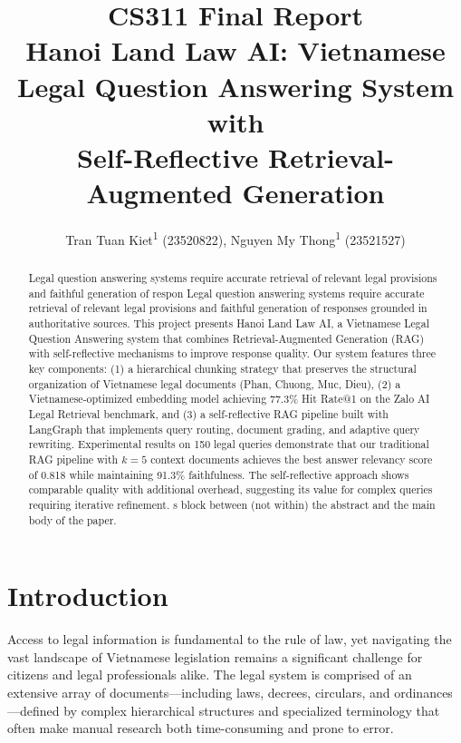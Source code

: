 \documentclass[letterpaper]{article} %
\title{CS311 Final Report \\ 
Hanoi Land Law AI: Vietnamese Legal Question Answering System with \\ Self-Reflective Retrieval-Augmented Generation}
\author{
    Tran Tuan Kiet\textsuperscript{\rm 1} (23520822),
    Nguyen My Thong\textsuperscript{\rm 1}  (23521527)
}
\begin{document}
\maketitle

\begin{abstract}
Legal question answering systems require accurate retrieval of relevant legal provisions and faithful generation of respon	Legal question answering systems require accurate retrieval of relevant legal provisions and faithful generation of responses grounded in authoritative sources. This project presents Hanoi Land Law AI, a Vietnamese Legal Question Answering system that combines Retrieval-Augmented Generation (RAG) with self-reflective mechanisms to improve response quality. Our system features three key components: (1) a hierarchical chunking strategy that preserves the structural organization of Vietnamese legal documents (Phan, Chuong, Muc, Dieu), (2) a Vietnamese-optimized embedding model achieving 77.3\% Hit Rate@1 on the Zalo AI Legal Retrieval benchmark, and (3) a self-reflective RAG pipeline built with LangGraph that implements query routing, document grading, and adaptive query rewriting. Experimental results on 150 legal queries demonstrate that our traditional RAG pipeline with $k=5$ context documents achieves the best answer relevancy score of 0.818 while maintaining 91.3\% faithfulness. The self-reflective approach shows comparable quality with additional overhead, suggesting its value for complex queries requiring iterative refinement.
s block between (not within) the abstract and the main body of the paper.
\end{abstract}
\begin{links}
\end{links}

\section{Introduction}

Access to legal information is fundamental to the rule of law, yet navigating the vast landscape of Vietnamese legislation remains a significant challenge for citizens and legal professionals alike. The legal system is comprised of an extensive array of documents—including laws, decrees, circulars, and ordinances—defined by complex hierarchical structures and specialized terminology that often make manual research both time-consuming and prone to error.
\end{document}
